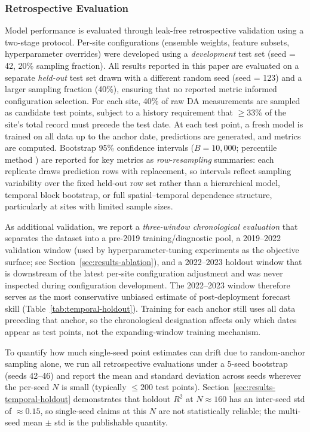 \documentclass[toxins,article,submit,moreauthors]{Definitions/mdpi}
\begin{document}
\subsubsection{Retrospective Evaluation}

Model performance is evaluated through leak-free retrospective validation using a two-stage protocol. Per-site configurations (ensemble weights, feature subsets, hyperparameter overrides) were developed using a \textit{development} test set (seed = 42, 20\% sampling fraction). All results reported in this paper are evaluated on a separate \textit{held-out} test set drawn with a different random seed (seed = 123) and a larger sampling fraction (40\%), ensuring that no reported metric informed configuration selection. For each site, 40\% of raw DA measurements are sampled as candidate test points, subject to a history requirement that $\geq 33\%$ of the site's total record must precede the test date. At each test point, a fresh model is trained on all data up to the anchor date, predictions are generated, and metrics are computed. Bootstrap 95\% confidence intervals ($B = 10{,}000$; percentile method \cite{Efron1979}) are reported for key metrics as \emph{row-resampling} summaries: each replicate draws prediction rows with replacement, so intervals reflect sampling variability over the fixed held-out row set rather than a hierarchical model, temporal block bootstrap, or full spatial--temporal dependence structure, particularly at sites with limited sample sizes.

As additional validation, we report a \textit{three-window chronological evaluation} that separates the dataset into a pre-2019 training/diagnostic pool, a 2019--2022 validation window (used by hyperparameter-tuning experiments as the objective surface; see Section~\ref{sec:results-ablation}), and a 2022--2023 holdout window that is downstream of the latest per-site configuration adjustment and was never inspected during configuration development. The 2022--2023 window therefore serves as the most conservative unbiased estimate of post-deployment forecast skill (Table~\ref{tab:temporal-holdout}). Training for each anchor still uses all data preceding that anchor, so the chronological designation affects only which dates appear as test points, not the expanding-window training mechanism.

To quantify how much single-seed point estimates can drift due to random-anchor sampling alone, we run all retrospective evaluations under a 5-seed bootstrap (seeds 42--46) and report the mean and standard deviation across seeds wherever the per-seed $N$ is small (typically $\leq 200$ test points). Section~\ref{sec:results-temporal-holdout} demonstrates that holdout $R^2$ at $N \approx 160$ has an inter-seed std of $\approx 0.15$, so single-seed claims at this $N$ are not statistically reliable; the multi-seed mean $\pm$ std is the publishable quantity.
\end{document}
